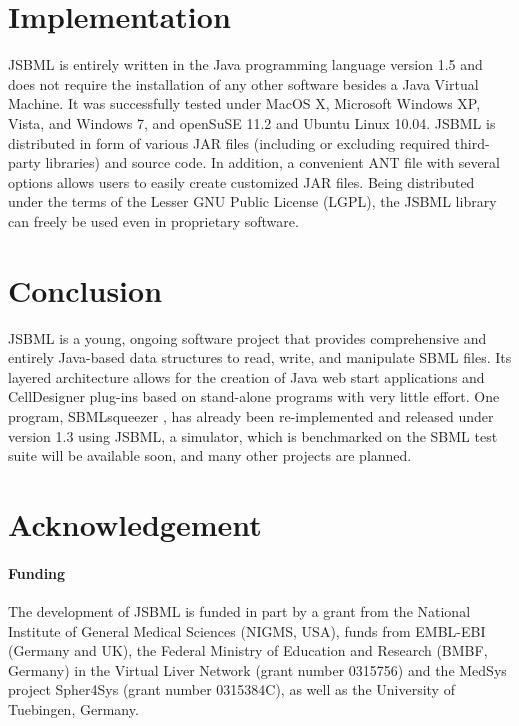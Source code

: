 \documentclass{bioinfo}
\begin{document}
\section{Implementation}

JSBML is entirely written in the Java\texttrademark{} programming language version 1.5 and does 
not require the installation of any other software besides a Java Virtual Machine. It was successfully
tested under MacOS X, Microsoft Windows XP, Vista, and Windows 7, and openSuSE 11.2 and 
Ubuntu Linux 10.04. JSBML is distributed in form of various JAR files (including or excluding required
third-party libraries) and source code. In addition, a convenient ANT file with several options allows 
users to easily create customized JAR files. Being distributed under the terms of the Lesser GNU
Public License (LGPL), the JSBML library can freely be used even in proprietary software.



\section{Conclusion}

JSBML is a young, ongoing software project that
provides comprehensive and entirely Java-based data structures
to read, write, and manipulate SBML files. Its layered architecture
allows for the creation of Java web start applications and
CellDesigner plug-ins based on stand-alone programs with very
little effort. One program, SBMLsqueezer \citep{Draeger2008}, has already been
re-implemented and released under version 1.3 using JSBML, a simulator, which is
benchmarked on the SBML test suite will be available soon, and
many other projects are planned.

\section*{Acknowledgement}

\paragraph{Funding\textcolon}

The development of JSBML is funded in part by a grant from the National Institute
of General Medical Sciences (NIGMS, USA), funds from EMBL-EBI (Germany and UK), 
the Federal Ministry of Education and Research (BMBF, Germany) in the Virtual 
Liver Network (grant number 0315756) and the MedSys project Spher4Sys 
(grant number 0315384C), as well as the University of Tuebingen, Germany. 
\end{document}
